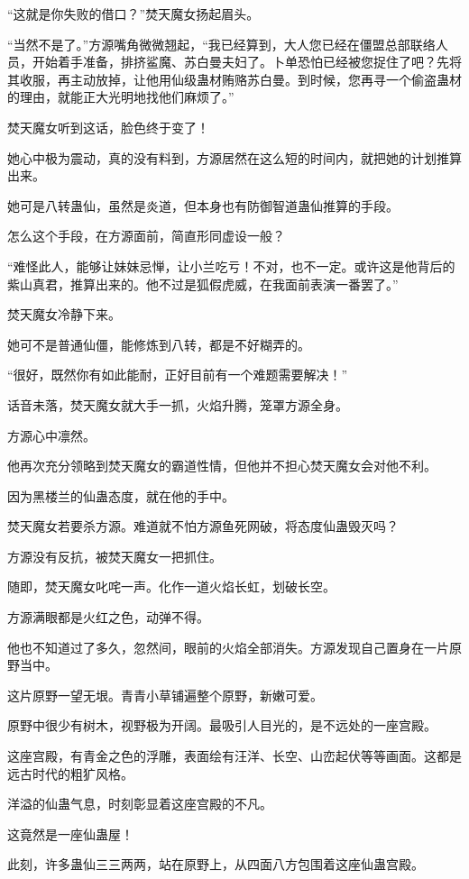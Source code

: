 \begin{this_body}
“这就是你失败的借口？”焚天魔女扬起眉头。

“当然不是了。”方源嘴角微微翘起，“我已经算到，大人您已经在僵盟总部联络人员，开始着手准备，排挤鲨魔、苏白曼夫妇了。卜单恐怕已经被您捉住了吧？先将其收服，再主动放掉，让他用仙级蛊材贿赂苏白曼。到时候，您再寻一个偷盗蛊材的理由，就能正大光明地找他们麻烦了。”

焚天魔女听到这话，脸色终于变了！

她心中极为震动，真的没有料到，方源居然在这么短的时间内，就把她的计划推算出来。

她可是八转蛊仙，虽然是炎道，但本身也有防御智道蛊仙推算的手段。

怎么这个手段，在方源面前，简直形同虚设一般？

“难怪此人，能够让妹妹忌惮，让小兰吃亏！不对，也不一定。或许这是他背后的紫山真君，推算出来的。他不过是狐假虎威，在我面前表演一番罢了。”

焚天魔女冷静下来。

她可不是普通仙僵，能修炼到八转，都是不好糊弄的。

“很好，既然你有如此能耐，正好目前有一个难题需要解决！”

话音未落，焚天魔女就大手一抓，火焰升腾，笼罩方源全身。

方源心中凛然。

他再次充分领略到焚天魔女的霸道性情，但他并不担心焚天魔女会对他不利。

因为黑楼兰的仙蛊态度，就在他的手中。

焚天魔女若要杀方源。难道就不怕方源鱼死网破，将态度仙蛊毁灭吗？

方源没有反抗，被焚天魔女一把抓住。

随即，焚天魔女叱咤一声。化作一道火焰长虹，划破长空。

方源满眼都是火红之色，动弹不得。

他也不知道过了多久，忽然间，眼前的火焰全部消失。方源发现自己置身在一片原野当中。

这片原野一望无垠。青青小草铺遍整个原野，新嫩可爱。

原野中很少有树木，视野极为开阔。最吸引人目光的，是不远处的一座宫殿。

这座宫殿，有青金之色的浮雕，表面绘有汪洋、长空、山峦起伏等等画面。这都是远古时代的粗犷风格。

洋溢的仙蛊气息，时刻彰显着这座宫殿的不凡。

这竟然是一座仙蛊屋！

此刻，许多蛊仙三三两两，站在原野上，从四面八方包围着这座仙蛊宫殿。


\end{this_body}
